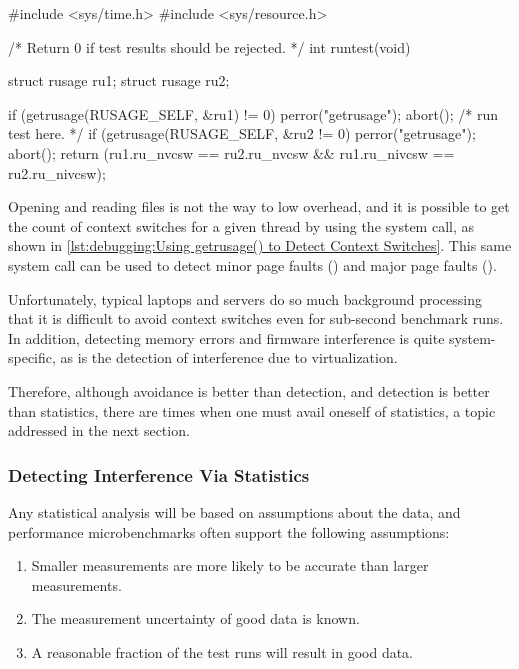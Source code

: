 \begin{listing}
\begin{fcvlabel}
\begin{VerbatimL}
#include <sys/time.h>
#include <sys/resource.h>

/* Return 0 if test results should be rejected. */
int runtest(void)
{
	struct rusage ru1;
	struct rusage ru2;

	if (getrusage(RUSAGE_SELF, &ru1) != 0) {
		perror("getrusage");
		abort();
	}
	/* run test here. */
	if (getrusage(RUSAGE_SELF, &ru2 != 0) {
		perror("getrusage");
		abort();
	}
	return (ru1.ru_nvcsw == ru2.ru_nvcsw &&
	        ru1.ru_nivcsw == ru2.ru_nivcsw);
}
\end{VerbatimL}
\end{fcvlabel}
\caption{Using  to Detect Context Switches}
\label{lst:debugging:Using getrusage() to Detect Context Switches}
\end{listing}

Opening and reading files is not the way to low overhead, and it is
possible to get the count of context switches for a given thread
by using the  system call, as shown in
\cref{lst:debugging:Using getrusage() to Detect Context Switches}.
This same system call can be used to detect minor page faults ()
and major page faults ().

Unfortunately, typical laptops and servers do so much background
processing that it is difficult to avoid context switches even for
sub-second benchmark runs.
In addition, detecting memory errors and firmware interference is
quite system-specific, as is the detection of interference due to
virtualization.

Therefore, although avoidance is better than detection, and detection
is better than statistics, there are times when one must avail oneself
of statistics, a topic addressed in the next section.

\subsubsection{Detecting Interference Via Statistics}
\label{sec:debugging:Detecting Interference Via Statistics}

Any statistical analysis will be based on assumptions about the data,
and performance microbenchmarks often support the following assumptions:

\begin{enumerate}
\item	Smaller measurements are more likely to be accurate than
	larger measurements.
\item	The measurement uncertainty of good data is known.
\item	A reasonable fraction of the test runs will result in good data.
\end{enumerate}


